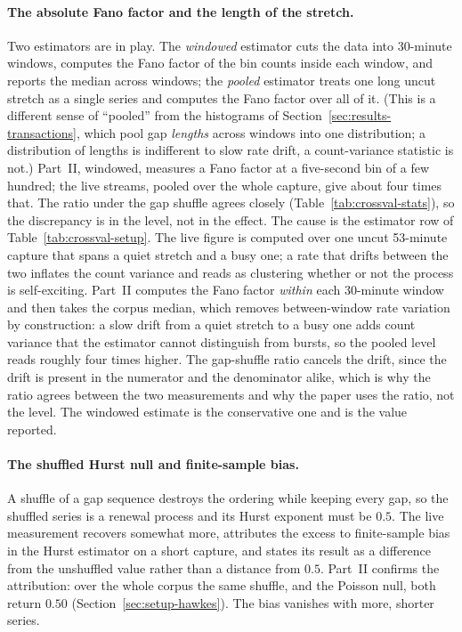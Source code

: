 \documentclass[11pt]{article}
\begin{document}
\paragraph{The absolute Fano factor and the length of the stretch.}
Two estimators are in play. The \emph{windowed} estimator cuts the data into 30-minute
windows, computes the Fano factor of the bin counts inside each window, and reports the
median across windows; the \emph{pooled} estimator treats one long uncut stretch as a
single series and computes the Fano factor over all of it. (This is a different sense
of ``pooled'' from the histograms of Section~\ref{sec:results-transactions}, which pool
gap \emph{lengths} across windows into one distribution; a distribution of lengths is
indifferent to slow rate drift, a count-variance statistic is not.) Part~II, windowed,
measures a Fano factor at a five-second bin of a few hundred; the live streams, pooled
over the whole capture, give about four times that. The ratio under the gap shuffle agrees closely (Table~\ref{tab:crossval-stats}),
so the discrepancy is in the level, not in the effect. The cause is the estimator row of
Table~\ref{tab:crossval-setup}. The live figure is computed over one uncut 53-minute
capture that spans a quiet stretch and a busy one; a rate that drifts between the two
inflates the count variance and reads as clustering whether or not the process is
self-exciting. Part~II computes the Fano factor \emph{within} each 30-minute window and
then takes the corpus median, which removes between-window rate variation by
construction: a slow drift from a quiet stretch to a busy one adds count variance that
the estimator cannot distinguish from bursts, so the pooled level reads roughly four times
higher. The gap-shuffle ratio cancels the drift, since the drift is present in the
numerator and the denominator alike, which is why the ratio agrees between the two
measurements and why the paper uses the ratio, not the level. The windowed estimate is
the conservative one and is the value reported.

\paragraph{The shuffled Hurst null and finite-sample bias.} A shuffle of a gap sequence
destroys the ordering while keeping every gap, so the shuffled series is a renewal process
and its Hurst exponent must be $0.5$. The live measurement recovers somewhat more,
attributes the excess to finite-sample bias in the Hurst estimator on a short capture, and
states its result as a difference from the unshuffled value rather than a distance from
$0.5$. Part~II confirms the attribution: over the whole corpus the same shuffle, and the
Poisson null, both return $0.50$ (Section~\ref{sec:setup-hawkes}). The bias vanishes with
more, shorter series.
\end{document}
